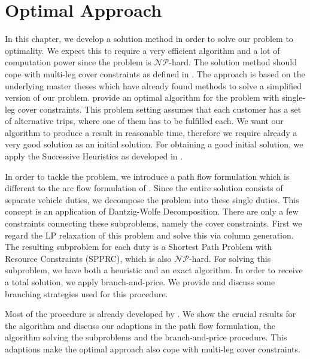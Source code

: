 \chapter{Optimal Approach}
\label{ch:optimal_approach}

In this chapter, we develop a solution method in order to solve our problem to optimality. We expect this to require a very efficient algorithm and a lot of computation power since the problem is $\mathcal{NP}$-hard. The solution method should cope with multi-leg cover constraints as defined in . The approach is based on the underlying master theses which have already found methods to solve a simplified version of our problem. \cite{Kaiser} provide an optimal algorithm for the problem with single-leg cover constraints. This problem setting assumes that each customer has a set of alternative trips, where one of them has to be fulfilled each. We want our algorithm to produce a result in reasonable time, therefore we require already a very good solution as an initial solution. For obtaining a good initial solution, we apply the Successive Heuristics as developed in .

In order to tackle the problem, we introduce a path flow formulation which is different to the arc flow formulation of . Since the entire solution consists of separate vehicle duties, we decompose the problem into these single duties. This concept is an application of Dantzig-Wolfe Decomposition. There are only a few constraints connecting these subproblems, namely the cover constraints. First we regard the LP relaxation of this problem and solve this via column generation. The resulting subproblem for each duty is a Shortest Path Problem with Resource Constraints (SPPRC), which is also $\mathcal{NP}$-hard. For solving this subproblem, we have both a heuristic and an exact algorithm. In order to receive a total solution, we apply branch-and-price. We provide and discuss some branching strategies used for this procedure.

Most of the procedure is already developed by \cite{Kaiser}. We show the crucial results for the algorithm and discuss our adaptions in the path flow formulation, the algorithm solving the subproblems and the branch-and-price procedure. This adaptions make the optimal approach also cope with multi-leg cover constraints.


